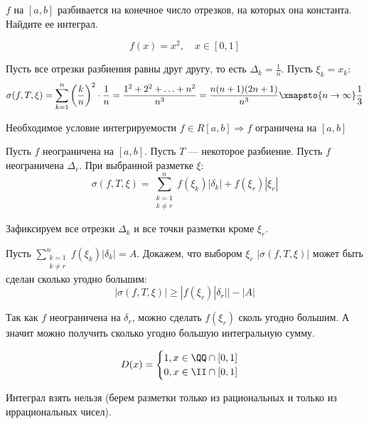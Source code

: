 \begin{exercise}{}{}
    \( f \) на \( [a, b] \) разбивается на конечное число отрезков,
    на которых она константа. Найдите ее интеграл.
\end{exercise}

\begin{example}{}{}
    \[
        f(x) = x^2, \quad x \in [0, 1]
    \]
\end{example}

Пусть все отрезки разбиения равны друг другу,
то есть \( \Delta_k = \frac{1}{n} \).
Пусть \( \xi_k = x_k \):
\[
    \sigma(f, T, \xi)
    =
    \sum\limits_{k = 1}^{n} \left( \frac{k}{n} \right)^2 \cdot \frac{1}{n}
    =
    \frac{1^2 + 2^2 + \ldots + n^2}{n^3}
    =
    \frac{n(n + 1)(2n + 1)}{n^3}
    \xmapsto{n \to \infty}
    \frac{1}{3}
\]

\begin{thrm}{Необходимое условие интегрируемости}{}
    \( f \in R[a, b] \Rightarrow f \) ограничена на \( [a, b] \)
\end{thrm}

Пусть \( f \) неограничена на \( [a, b] \).
Пусть \( T \) --- некоторое разбиение.
Пусть \( f \) неограничена \( \Delta_r \).
При выбранной разметке \( \xi \):
\[
    \sigma(f, T, \xi)
    =
    \sum\limits_{\substack{k = 1 \\ k \neq r}}^{n} f(\xi_k) |\delta_k| + f(\xi_r) |\xi_r|
\]

Зафиксируем все отрезки \( \Delta_k \) и все точки разметки кроме \( \xi_r \).

Пусть \( \sum\limits_{\substack{k = 1 \\ k \neq r}}^{n} f(\xi_k) |\delta_k| = A \).
Докажем, что выбором \( \xi_r \) \( |\sigma(f, T, \xi)| \) может быть сделан сколько угодно большим:
\[
    |\sigma(f, T, \xi)| \geq |f(\xi_r) | \delta_r | | - |A|
\]

Так как \( f \) неограничена на \( \delta_r \),
можно сделать \( f(\xi_r) \) сколь угодно большим.
А значит можно получить сколько угодно большую интегральную сумму.

\begin{example}{}{}
    \[
        D(x) = \begin{cases}
            1, x \in \QQ \cap [0, 1]
            \\
            0, x \in \II \cap [0, 1]
        \end{cases}
    \]

    Интеграл взять нельзя (берем разметки только из рациональных и только из иррациональных чисел).
\end{example}


